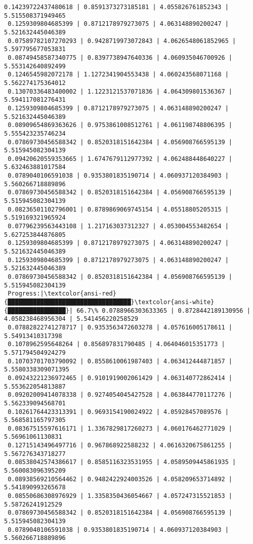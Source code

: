 \documentclass[11pt]{article}
\begin{document}
\begin{Verbatim}[commandchars=\\\{\}]
 0.14239722437480618 | 0.8591373273185181 | 4.055826761852343 | 5.515508371949465
 0.1259309804685399 | 0.8712178979273075 | 4.063148890200247 | 5.521632445046389
 0.07589782107270293 | 0.9428719973072843 | 4.0626548061852965 | 5.597795677053831
 0.08749458587340775 | 0.8397738947640336 | 4.060935046700926 | 5.553142640892499
 0.1246545982072178 | 1.1272341904553438 | 4.060243568071168 | 5.562274175364012
 0.13070336483400002 | 1.1223121537071836 | 4.064309801536367 | 5.594117081276431
 0.1259309804685399 | 0.8712178979273075 | 4.063148890200247 | 5.521632445046389
 0.08909654869363626 | 0.9753861008512761 | 4.061198748806395 | 5.555423235746234
 0.07869730456588342 | 0.8520318151642384 | 4.056908766595139 | 5.515945082304139
 0.09420620559353665 | 1.6747679112977392 | 4.062488448640227 | 5.632463881017584
 0.0789040106591038 | 0.9353801835190714 | 4.060937120384903 | 5.560266718889896
 0.07869730456588342 | 0.8520318151642384 | 4.056908766595139 | 5.515945082304139
 0.08236501102796001 | 0.8789869069745154 | 4.05518805205315 | 5.519169321965924
 0.07796239563443108 | 1.217163037312327 | 4.053004553482654 | 5.627253844876805
 0.1259309804685399 | 0.8712178979273075 | 4.063148890200247 | 5.521632445046389
 0.1259309804685399 | 0.8712178979273075 | 4.063148890200247 | 5.521632445046389
 0.07869730456588342 | 0.8520318151642384 | 4.056908766595139 | 5.515945082304139
 Progress:|\textcolor{ansi-red}{██████████████████████████████████}\textcolor{ansi-white}{████████████████}| 66.7\% 0.0788966303633365 | 0.8728442189130956 | 4.058238468956304 | 5.541456220258529
 0.07882822741278717 | 0.9353563472603278 | 4.057616005178611 | 5.54913410317398
 0.1078962595648264 | 0.856897831790485 | 4.064046015351773 | 5.571794504924279
 0.10703701703790092 | 0.8558610061987403 | 4.063412444871857 | 5.5580338309071395
 0.09243221236972465 | 0.9101919002061429 | 4.063140772862414 | 5.553622054813887
 0.09202009414078338 | 0.9274054045427528 | 4.063844770117276 | 5.562339094568701
 0.10261764423313391 | 0.9693154190024922 | 4.05928457089576 | 5.568581165797305
 0.08367515597616171 | 1.3367829817260273 | 4.060176462771029 | 5.56961061130831
 0.12715143496497716 | 0.967868922588232 | 4.0616320675861255 | 5.567276343718277
 0.08538042574386617 | 0.8585116323531955 | 4.0589509445861935 | 5.560083096395209
 0.08938569210564462 | 0.9482422924003526 | 4.058209653714892 | 5.541890993265678
 0.08550686308976929 | 1.3358350436054667 | 4.057247315521853 | 5.58726241912529
 0.07869730456588342 | 0.8520318151642384 | 4.056908766595139 | 5.515945082304139
 0.0789040106591038 | 0.9353801835190714 | 4.060937120384903 | 5.560266718889896

\end{Verbatim}
\end{document}
